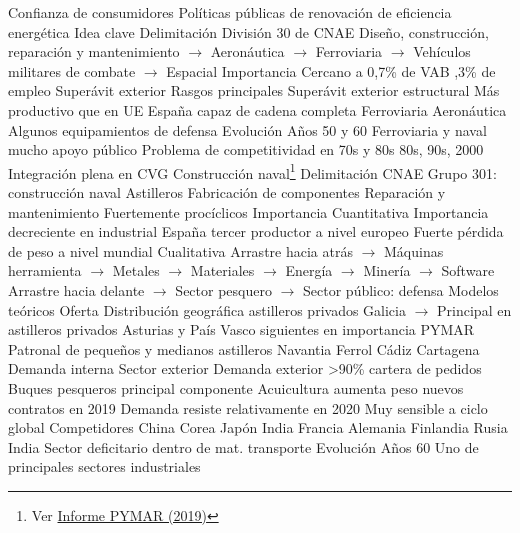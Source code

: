 \documentclass{nuevotema}
\begin{document}
\begin{esquemal}
				\4[] Confianza de consumidores
				\4[] Políticas públicas de renovación de eficiencia energética
	\1 
		\2 Idea clave
			\3 Delimitación
				\4 División 30 de CNAE
				\4 Diseño, construcción, reparación y mantenimiento
				\4[] $\to$ Aeronáutica
				\4[] $\to$ Ferroviaria
				\4[] $\to$ Vehículos militares de combate
				\4[] $\to$ Espacial
			\3 Importancia
				\4 Cercano a 0,7\% de VAB
				,3\% de empleo
				\4 Superávit exterior
			\3 Rasgos principales
				\4 Superávit exterior estructural
				\4 Más productivo que en UE
				\4 España capaz de cadena completa
				\4[] Ferroviaria
				\4[] Aeronáutica
				\4[] Algunos equipamientos de defensa
			\3 Evolución
				\4 Años 50 y 60
				\4[] Ferroviaria y naval mucho apoyo público
				\4[] Problema de competitividad en 70s y 80s
				\4 80s, 90s, 2000
				\4[] Integración plena en CVG
		\2 Construcción naval\footnote{Ver \href{https://pymar.com/sites/default/files/pymar_informe_anual_2019.pdf}{Informe PYMAR (2019)}}
			\3 Delimitación
				\4 CNAE Grupo 301: construcción naval
				\4 Astilleros
				\4 Fabricación de componentes
				\4 Reparación y mantenimiento
				\4 Fuertemente procíclicos
			\3 Importancia
				\4 Cuantitativa
				\4[] Importancia decreciente en industrial
				\4[] España tercer productor a nivel europeo
				\4[] Fuerte pérdida de peso a nivel mundial
				\4 Cualitativa
				\4[] Arrastre hacia atrás
				\4[] $\to$ Máquinas herramienta
				\4[] $\to$ Metales
				\4[] $\to$ Materiales
				\4[] $\to$ Energía
				\4[] $\to$ Minería
				\4[] $\to$ Software
				\4[] Arrastre hacia delante
				\4[] $\to$ Sector pesquero
				\4[] $\to$ Sector público: defensa
			\3 Modelos teóricos
			\3 Oferta
				\4 Distribución geográfica astilleros privados
				\4[] Galicia
				\4[] $\to$ Principal en astilleros privados
				\4[] Asturias y País Vasco siguientes en importancia
				\4 PYMAR
				\4[] Patronal de pequeños y medianos astilleros
				\4 Navantia
				\4[] Ferrol
				\4[] Cádiz
				\4[] Cartagena
			\3 Demanda interna
			\3 Sector exterior
				\4 Demanda exterior
				\4[] >90\% cartera de pedidos
				\4[] Buques pesqueros principal componente
				\4[] Acuicultura aumenta peso
				 nuevos contratos en 2019
				\4[] Demanda resiste relativamente en 2020
				\4[] Muy sensible a ciclo global
				\4 Competidores
				\4[] China
				\4[] Corea
				\4[] Japón
				\4[] India
				\4[] Francia
				\4[] Alemania
				\4[] Finlandia
				\4[] Rusia
				\4[] India
				\4 Sector deficitario dentro de mat. transporte
			\3 Evolución
				\4 Años 60
				\4[] Uno de principales sectores industriales

\end{esquemal}
\end{document}
